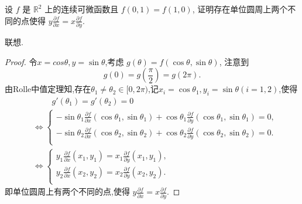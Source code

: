 \documentclass[../../main.tex]{subfiles}
\begin{document}
\begin{example}
设 \( f \) 是 \( \mathbb{R}^2 \) 上的连续可微函数且 \( f(0, 1) = f(1, 0) \), 证明存在单位圆周上两个不同的点使得 \( y \frac{\partial f}{\partial x} = x \frac{\partial f}{\partial y} \).
\end{example}
\begin{note}
联想.
\end{note}
\begin{proof}
令$x=cos\theta ,y=\sin\theta $,考虑 \( g(\theta) = f(\cos \theta, \sin \theta) \), 注意到
\[
g(0) = g\left( \frac{\pi}{2} \right) = g(2\pi).
\]
由Rolle中值定理知,存在$\theta_1\ne \theta_2 \in [0,2\pi)$,记$x_i=\cos\theta_1,y_i=\sin\theta(i=1,2)$,使得
\begin{align*}
&\quad \quad \,\,g' \left( \theta _1 \right) =g' \left( \theta _2 \right) =0
\\
&\Longleftrightarrow \begin{cases}
-\sin \theta _1\frac{\partial f}{\partial x}\left( \cos \theta _1,\sin \theta _1 \right) +\cos \theta _1\frac{\partial f}{\partial y}\left( \cos \theta _1,\sin \theta _1 \right) =0,\\
-\sin \theta _2\frac{\partial f}{\partial x}\left( \cos \theta _2,\sin \theta _2 \right) +\cos \theta _2\frac{\partial f}{\partial y}\left( \cos \theta _2,\sin \theta _2 \right) =0.\\
\end{cases}
\\
&\Longleftrightarrow \begin{cases}
y_1\frac{\partial f}{\partial x}\left( x_1,y_1 \right) =x_1\frac{\partial f}{\partial y}\left( x_1,y_1 \right) ,\\
y_2\frac{\partial f}{\partial x}\left( x_2,y_2 \right) =x_2\frac{\partial f}{\partial y}\left( x_2,y_2 \right).\\
\end{cases}
\end{align*}
即单位圆周上有两个不同的点,使得 \( y \frac{\partial f}{\partial x} = x \frac{\partial f}{\partial y} \).
\end{proof}
\end{document}
